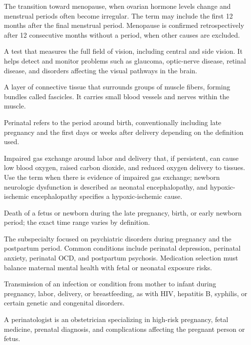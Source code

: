  The transition toward menopause, when ovarian hormone levels change and menstrual periods often become irregular. The term may include the first 12 months after the final menstrual period. Menopause is confirmed retrospectively after 12 consecutive months without a period, when other causes are excluded.

 A test that measures the full field of vision, including central and side vision. It helps detect and monitor problems such as glaucoma, optic-nerve disease, retinal disease, and disorders affecting the visual pathways in the brain.

 A layer of connective tissue that surrounds groups of muscle fibers, forming bundles called fascicles. It carries small blood vessels and nerves within the muscle.

 Perinatal refers to the period around birth, conventionally including late pregnancy and the first days or weeks after delivery depending on the definition used.

 Impaired gas exchange around labor and delivery that, if persistent, can cause low blood oxygen, raised carbon dioxide, and reduced oxygen delivery to tissues. Use the term when there is evidence of impaired gas exchange; newborn neurologic dysfunction is described as neonatal encephalopathy, and hypoxic-ischemic encephalopathy specifies a hypoxic-ischemic cause.

 Death of a fetus or newborn during the late pregnancy, birth, or early newborn period; the exact time range varies by definition.

 The subspecialty focused on psychiatric disorders during pregnancy and the postpartum
period. Common conditions include perinatal depression, perinatal anxiety, perinatal
OCD, and postpartum psychosis. Medication selection must balance maternal mental health
with fetal or neonatal exposure risks.

 Transmission of an infection or condition from mother to infant during pregnancy, labor, delivery, or breastfeeding, as with HIV, hepatitis B, syphilis, or certain genetic and congenital disorders.

 A perinatologist is an obstetrician specializing in high-risk pregnancy, fetal medicine, prenatal diagnosis, and complications affecting the pregnant person or fetus.

